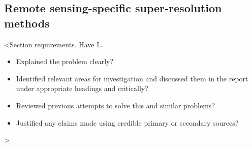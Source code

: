 \subsection{Remote sensing-specific super-resolution methods}
<Section requirements. Have I\dots
\begin{itemize}
    \item Explained the problem clearly?
    \item Identified relevant areas for investigation and discussed them in the report under appropriate headings and critically?
    \item Reviewed previous attempts to solve this and similar problems?
    \item Justified any claims made using credible primary or secondary sources?
\end{itemize}
>